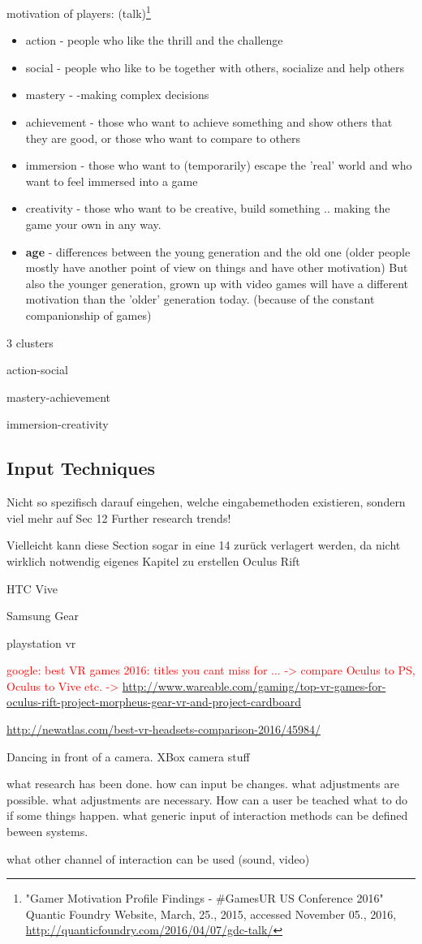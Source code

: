 motivation of players: (talk)\footnote{"Gamer Motivation Profile Findings - \#GamesUR US Conference 2016" Quantic Foundry Website, March, 25., 2015, accessed November 05., 2016, \url{http://quanticfoundry.com/2016/04/07/gdc-talk/}}
\begin{itemize}
	\item action - people who like the thrill and the challenge
	\item social - people who like to be together with others, socialize and help others
	\item mastery - -making complex decisions
	\item achievement - those who want to achieve something and show others that they are good, or those who want to compare to others
	\item immersion - those who want to (temporarily) escape the 'real' world and who want to feel immersed into a game
	\item creativity - those who want to be creative, build something .. making the game your own in any way. 
	\item \textbf{age} - differences between the young generation and the old one (older people mostly have another point of view on things and have other motivation) But also the younger generation, grown up with video games will have a different motivation than the 'older' generation today. (because of the constant companionship of games)
\end{itemize}

3 clusters 

action-social

mastery-achievement

immersion-creativity

\subsection{Input Techniques}
Nicht so spezifisch darauf eingehen, welche eingabemethoden existieren, sondern viel mehr auf Sec 12 Further research trends!

Vielleicht kann diese Section sogar in eine 14 zurück verlagert werden, da nicht wirklich notwendig eigenes Kapitel zu erstellen 
Oculus Rift

HTC Vive

Samsung Gear

playstation vr

\textcolor{red}{google: best VR games 2016: titles you cant miss for ... -> compare Oculus to PS, Oculus to Vive etc. -> \url{http://www.wareable.com/gaming/top-vr-games-for-oculus-rift-project-morpheus-gear-vr-and-project-cardboard}}

\url{http://newatlas.com/best-vr-headsets-comparison-2016/45984/}

Dancing in front of a camera. XBox camera stuff

what research has been done. how can input be changes. what adjustments are possible. what adjustments are necessary. How can a user be teached what to do if some things happen. what generic input of interaction methods can be defined beween systems.

what other channel of interaction can be used (sound, video)
